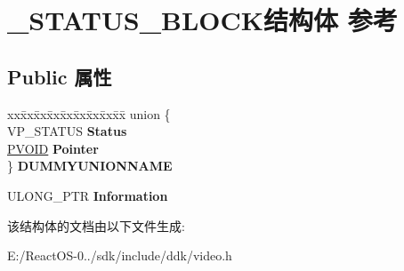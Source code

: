 \hypertarget{struct___s_t_a_t_u_s___b_l_o_c_k}{}\section{\+\_\+\+S\+T\+A\+T\+U\+S\+\_\+\+B\+L\+O\+C\+K结构体 参考}
\label{struct___s_t_a_t_u_s___b_l_o_c_k}
\subsection*{Public 属性}
\begin{DoxyCompactItemize}
\item 
\mbox{\label{struct___s_t_a_t_u_s___b_l_o_c_k_ae4fe5736f499792638a2310b7216f0c7}} 
\begin{tabbing}
xx\=xx\=xx\=xx\=xx\=xx\=xx\=xx\=xx\=\kill
union \{\\
\>VP\_STATUS {\bfseries Status}\\
\>\hyperlink{interfacevoid}{PVOID} {\bfseries Pointer}\\
\} {\bfseries DUMMYUNIONNAME}\\

\end{tabbing}\item 
\mbox{\label{struct___s_t_a_t_u_s___b_l_o_c_k_adecf2e2d0e02db4f319d289d2e9753bc}} 
U\+L\+O\+N\+G\+\_\+\+P\+TR {\bfseries Information}
\end{DoxyCompactItemize}


该结构体的文档由以下文件生成\+:\begin{DoxyCompactItemize}
\item 
E\+:/\+React\+O\+S-\/0../sdk/include/ddk/video.\+h\end{DoxyCompactItemize}
